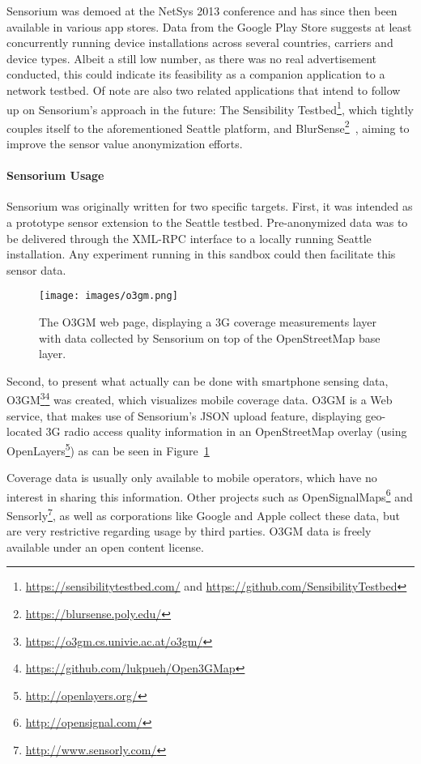 Sensorium was demoed at the NetSys 2013 conference and has since then been available in various app stores. Data from the Google Play Store suggests at least  concurrently running device installations across several countries, carriers and device types. Albeit a still low number, as there was no real advertisement conducted, this could indicate its feasibility as a companion application to a network testbed. Of note are also two related applications that intend to follow up on Sensorium's approach in the future: The Sensibility Testbed\footnote{\url{https://sensibilitytestbed.com/} and \url{https://github.com/SensibilityTestbed}}, which tightly couples itself to the aforementioned Seattle platform, and BlurSense\footnote{\url{https://blursense.poly.edu/}}~\cite{6798970}, aiming to improve the sensor value anonymization efforts. 


\paragraph{Sensorium Usage}

Sensorium was originally written for two specific targets. First, it was intended as a prototype sensor extension to the Seattle testbed. Pre-anonymized data was to be delivered through the \acrshort{XML}-\acrshort{RPC} interface to a locally running Seattle installation. Any experiment running in this sandbox could then facilitate this sensor data.

\begin{figure}[htb]
	\centering
	\texttt{[image: images/o3gm.png]}
	\caption{The \acrshort{O3GM} web page, displaying a \acrshort{3G} coverage measurements layer with data collected by Sensorium on top of the OpenStreetMap base layer.}
\label{c5:fig:ogggm}
\end{figure}

Second, to present what actually can be done with smartphone sensing data, \gls{O3GM}\footnote{\url{https://o3gm.cs.univie.ac.at/o3gm/}}\footnote{\url{https://github.com/lukpueh/Open3GMap}} was created, which visualizes mobile coverage data. \gls{O3GM} is a Web service, that makes use of Sensorium's \acrshort{JSON} upload feature, displaying geo-located \gls{3G} radio access quality information in an OpenStreetMap overlay (using OpenLayers\footnote{\url{http://openlayers.org/}}) as can be seen in Figure~\ref{c5:fig:ogggm}

Coverage data is usually only available to mobile operators, which have no interest in sharing this information. Other projects such as OpenSignalMaps\footnote{\url{http://opensignal.com/}} and Sensorly\footnote{\url{http://www.sensorly.com/}}, as well as corporations like Google and Apple collect these data, but are very restrictive regarding usage by third parties. \gls{O3GM} data is freely available under an open content license.

